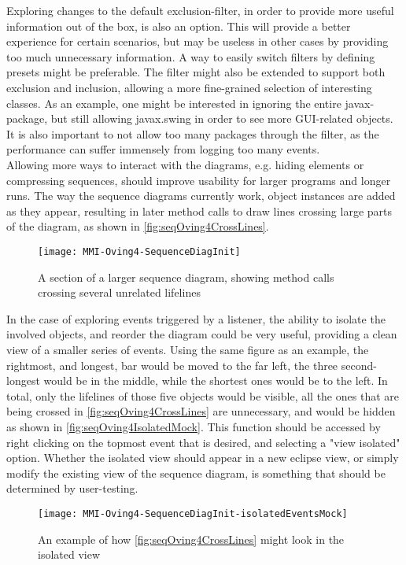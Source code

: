 Exploring changes to the default exclusion-filter, in order to provide more useful information out of the box, is also an option.
This will provide a better experience for certain scenarios, but may be useless in other cases by providing too much unnecessary information.
A way to easily switch filters by defining presets might be preferable.
The filter might also be extended to support both exclusion and inclusion, allowing a more fine-grained selection of interesting classes.
As an example, one might be interested in ignoring the entire javax-package, but still allowing javax.swing in order to see more GUI-related objects.
It is also important to not allow too many packages through the filter, as the performance can suffer immensely from logging too many events.
~\\

Allowing more ways to interact with the diagrams, e.g. hiding elements or compressing sequences, should improve usability for larger programs and longer runs.
The way the sequence diagrams currently work, object instances are added as they appear, resulting in later method calls to draw lines crossing large parts of the diagram, as shown in \autoref{fig:seqOving4CrossLines}.
\begin{figure}[H]
	\centering
	\texttt{[image: MMI-Oving4-SequenceDiagInit]}
	\caption{A section of a larger sequence diagram, showing method calls crossing several unrelated lifelines}
	\label{fig:seqOving4CrossLines}
\end{figure}
In the case of exploring events triggered by a listener, the ability to isolate the involved objects, and reorder the diagram could be very useful, providing a clean view of a smaller series of events.%
Using the same figure as an example, the rightmost, and longest, bar would be moved to the far left, the three second-longest would be in the middle, while the shortest ones would be to the left.
In total, only the lifelines of those five objects would be visible, all the ones that are being crossed in \autoref{fig:seqOving4CrossLines} are unnecessary, and would be hidden as shown in \autoref{fig:seqOving4IsolatedMock}.
This function should be accessed by right clicking on the topmost event that is desired, and selecting a "view isolated" option.
Whether the isolated view should appear in a new eclipse view, or simply modify the existing view of the sequence diagram, is something that should be determined by user-testing.
\begin{figure}[H]
	\centering
	\texttt{[image: MMI-Oving4-SequenceDiagInit-isolatedEventsMock]}
	\caption{An example of how \autoref{fig:seqOving4CrossLines} might look in the isolated view}
	\label{fig:seqOving4IsolatedMock}
\end{figure}
~\\

